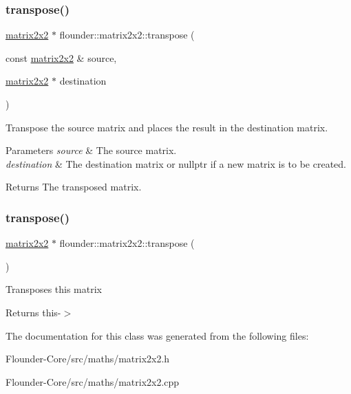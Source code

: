 \subsubsection{\texorpdfstring{transpose()}{transpose()}\hspace{0.1cm}{\footnotesize\ttfamily [1/2]}}
{\footnotesize\ttfamily \hyperlink{classflounder_1_1matrix2x2}{matrix2x2} $\ast$ flounder\+::matrix2x2\+::transpose (\begin{DoxyParamCaption}\item[{const \hyperlink{classflounder_1_1matrix2x2}{matrix2x2} \&}]{source,  }\item[{\hyperlink{classflounder_1_1matrix2x2}{matrix2x2} $\ast$}]{destination }\end{DoxyParamCaption})\hspace{0.3cm}{\ttfamily [static]}}



Transpose the source matrix and places the result in the destination matrix. 


\begin{DoxyParams}{Parameters}
{\em source} & The source matrix. \\
\hline
{\em destination} & The destination matrix or nullptr if a new matrix is to be created. \\
\hline
\end{DoxyParams}
\begin{DoxyReturn}{Returns}
The transposed matrix. 
\end{DoxyReturn}
\mbox{\label{classflounder_1_1matrix2x2_ab2c07c15e39a1ab13270d88d7d83ee47}} 
\subsubsection{\texorpdfstring{transpose()}{transpose()}\hspace{0.1cm}{\footnotesize\ttfamily [2/2]}}
{\footnotesize\ttfamily \hyperlink{classflounder_1_1matrix2x2}{matrix2x2} $\ast$ flounder\+::matrix2x2\+::transpose (\begin{DoxyParamCaption}{ }\end{DoxyParamCaption})}



Transposes this matrix 

\begin{DoxyReturn}{Returns}
this-\/$>$ 
\end{DoxyReturn}


The documentation for this class was generated from the following files\+:\begin{DoxyCompactItemize}
\item 
Flounder-\/\+Core/src/maths/matrix2x2.\+h\item 
Flounder-\/\+Core/src/maths/matrix2x2.\+cpp\end{DoxyCompactItemize}
